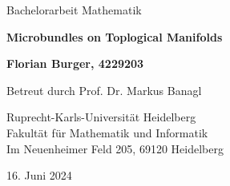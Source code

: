 \begin{titlepage}
\begin{center}
\vspace{1.5cm}

\begin{Large}Bachelorarbeit Mathematik\end{Large}

\vspace*{1cm}

\begin{LARGE}\textbf{Microbundles on Toplogical Manifolds}\end{LARGE}

\vspace{1cm}

\begin{large}\textbf{Florian Burger, 4229203}\end{large}

\vfill

\begin{large}
Betreut durch Prof. Dr. Markus Banagl

\vspace{0.5cm}

Ruprecht-Karls-Universität Heidelberg\\ Fakultät für Mathematik und Informatik\\ Im Neuenheimer Feld 205, 69120 Heidelberg

\vspace{0.5cm}
16. Juni 2024
\end{large}
\end{center}
\end{titlepage}